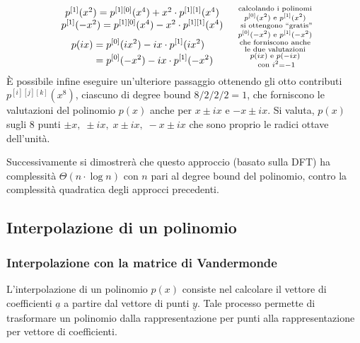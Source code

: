 \[\begin{array}{c c}
\begin{array}{c}
		p^{[1]}(x^2) = p^{[1][0]}(x^4) + x^2 \cdot p^{[1][1]}(x^4) \\
		p^{[1]}(-x^2) = p^{[1][0]}(x^4) - x^2 \cdot p^{[1][1]}(x^4) \\[7pt]
		\begin{aligned}
			p(ix) &= p^{[0]}({ix}^2) - ix \cdot p^{[1]}({ix}^2) \\ &= p^{[0]}(-x^2) - ix \cdot p^{[1]}(-x^2)
		\end{aligned}
	\end{array} & \substack{\text{calcolando i polinomi} \\ p^{[0]}(x^2) \text{ e } p^{[1]}(x^2) \\ \text{ si ottengono ``gratis''} \\ p^{[0]}(-x^2) \text{ e } p^{[1]}(-x^2) \\ \text{che forniscono anche} \\[1pt] \text{le due valutazioni} \\ p(ix) \text{ e } p(-ix) \\ \text{ con } i^2 = -1}
\end{array}\]
È possibile infine eseguire un'ulteriore passaggio ottenendo gli otto contributi \(p^{[i][j][k]}(x^8)\), ciascuno di
degree bound \(8/2/2/2 = 1\), che forniscono le valutazioni del polinomio \(p(x)\) anche per \(x \pm ix\) e \(-x \pm ix\).
Si valuta, \(p(x)\) sugli 8 punti \(\pm x, \; \pm ix,\; x \pm ix, \; -x \pm ix\) che sono proprio le radici ottave dell'unità.

Successivamente si dimostrerà che questo approccio (basato sulla DFT) ha complessità \(\Theta(n \cdot \log n)\) con \(n\)
pari al degree bound del polinomio, contro la complessità quadratica degli approcci precedenti.

\subsection{Interpolazione di un polinomio}
\subsubsection*{Interpolazione con la matrice di Vandermonde}
L'interpolazione di un polinomio \(p(x)\) consiste nel calcolare il vettore di coefficienti \(\underline{a}\) a partire
dal vettore di punti \(\underline{y}\). Tale processo permette di trasformare un polinomio dalla rappresentazione per
punti alla rappresentazione per vettore di coefficienti.

